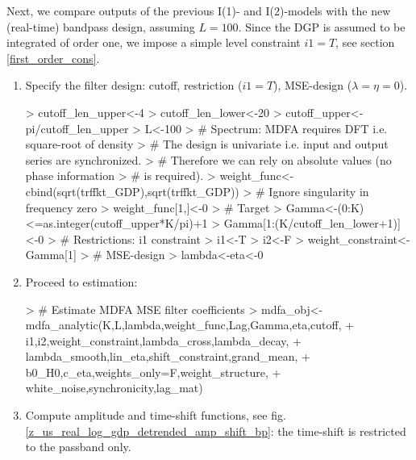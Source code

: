 \documentclass[a4paper]{book}
\begin{document}
Next, we compare outputs of the previous I(1)- and I(2)-models with the new (real-time) bandpass design, assuming $L=100$. Since the DGP is assumed to be integrated of order one, we impose a simple level constraint $i1=T$, see section \ref{first_order_cons}. 
\begin{enumerate}
\item Specify the filter design: cutoff, restriction ($i1=T$), MSE-design ($\lambda=\eta=0$).
\begin{Schunk}
\begin{Sinput}
> cutoff_len_upper<-4
> cutoff_len_lower<-20
> cutoff_upper<-pi/cutoff_len_upper
> L<-100
> # Spectrum: MDFA requires DFT i.e. square-root of density 
> # The design is univariate i.e. input and output series are synchronized.
> # Therefore we can rely on absolute values (no phase information 
> #   is required).
> weight_func<-cbind(sqrt(trffkt_GDP),sqrt(trffkt_GDP))
> # Ignore singularity in frequency zero 
> weight_func[1,]<-0
> # Target
> Gamma<-(0:K)<=as.integer(cutoff_upper*K/pi)+1
> Gamma[1:(K/cutoff_len_lower+1)]<-0
> # Restrictions: i1 constraint
> i1<-T
> i2<-F
> weight_constraint<-Gamma[1]
> # MSE-design
> lambda<-eta<-0
\end{Sinput}
\end{Schunk}
\item Proceed to estimation:
\begin{Schunk}
\begin{Sinput}
> # Estimate MDFA MSE filter coefficients  
> mdfa_obj<-mdfa_analytic(K,L,lambda,weight_func,Lag,Gamma,eta,cutoff,
+                   i1,i2,weight_constraint,lambda_cross,lambda_decay,
+                   lambda_smooth,lin_eta,shift_constraint,grand_mean,
+                   b0_H0,c_eta,weights_only=F,weight_structure,
+                   white_noise,synchronicity,lag_mat)
\end{Sinput}
\end{Schunk}
\item Compute amplitude and time-shift functions, see fig.\ref{z_us_real_log_gdp_detrended_amp_shift_bp}: the time-shift is restricted to the passband only.

\end{enumerate}
\end{document}
